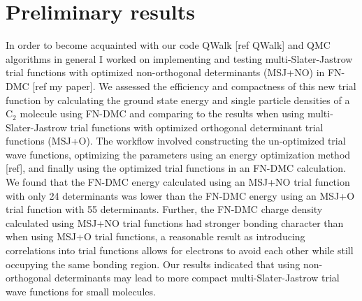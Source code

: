 \documentclass{article}
\begin{document}
\section{Preliminary results}
In order to become acquainted with our code QWalk [ref QWalk] and QMC algorithms in general I worked on implementing and testing multi-Slater-Jastrow trial functions with optimized non-orthogonal determinants (MSJ+NO) in FN-DMC [ref my paper]. 
We assessed the efficiency and compactness of this new trial function by calculating the ground state energy and single particle densities of a C$_2$ molecule using FN-DMC and comparing to the results when using multi-Slater-Jastrow trial functions with optimized orthogonal determinant trial functions (MSJ+O). 
The workflow involved constructing the un-optimized trial wave functions, optimizing the parameters using an energy optimization method [ref], and finally using the optimized trial functions in an FN-DMC calculation. 
We found that the FN-DMC energy calculated using an MSJ+NO trial function with only 24 determinants was lower than the FN-DMC energy using an MSJ+O trial function with 55 determinants. 
Further, the FN-DMC charge density calculated using MSJ+NO trial functions had stronger bonding character than when using MSJ+O trial functions, a reasonable result as introducing correlations into trial functions allows for electrons to avoid each other while still occupying the same bonding region. 
Our results indicated that using non-orthogonal determinants may lead to more compact multi-Slater-Jastrow trial wave functions for small molecules.
\end{document}
